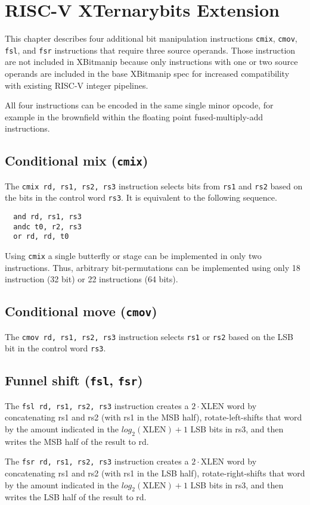 \chapter{RISC-V XTernarybits Extension}
\label{tbits}

This chapter describes four additional bit manipulation instructions {\tt cmix}, {\tt cmov},
{\tt fsl}, and {\tt fsr} instructions that require three source operands. Those instruction
are not included in XBitmanip because only instructions with one or two source operands are
included in the base XBitmanip spec for increased compatibility with existing RISC-V integer
pipelines.

All four instructions can be encoded in the same single minor opcode, for example in the
brownfield within the floating point fused-multiply-add instructions.

\section{Conditional mix ({\tt cmix})}

The {\tt cmix rd, rs1, rs2, rs3} instruction selects bits from {\tt rs1} and {\tt rs2} based
on the bits in the control word {\tt rs3}. It is equivalent to the following sequence.

\begin{verbatim}
  and rd, rs1, rs3
  andc t0, r2, rs3
  or rd, rd, t0
\end{verbatim}

Using {\tt cmix} a single butterfly or stage can be implemented in only two
instructions. Thus, arbitrary bit-permutations can be implemented using only
18 instruction (32 bit) or 22 instructions (64 bits).

\section{Conditional move ({\tt cmov})}

The {\tt cmov rd, rs1, rs2, rs3} instruction selects {\tt rs1} or {\tt rs2} based
on the LSB bit in the control word {\tt rs3}.

\section{Funnel shift ({\tt fsl}, {\tt fsr})}

The {\tt fsl rd, rs1, rs2, rs3} instruction creates a $2\cdot\textrm{XLEN}$ word
by concatenating rs1 and rs2 (with rs1 in the MSB half), rotate-left-shifts that
word by the amount indicated in the $log_2(\textrm{XLEN})+1$ LSB bits in rs3, and
then writes the MSB half of the result to rd.

The {\tt fsr rd, rs1, rs2, rs3} instruction creates a $2\cdot\textrm{XLEN}$ word
by concatenating rs1 and rs2 (with rs1 in the LSB half), rotate-right-shifts that
word by the amount indicated in the $log_2(\textrm{XLEN})+1$ LSB bits in rs3, and
then writes the LSB half of the result to rd.

